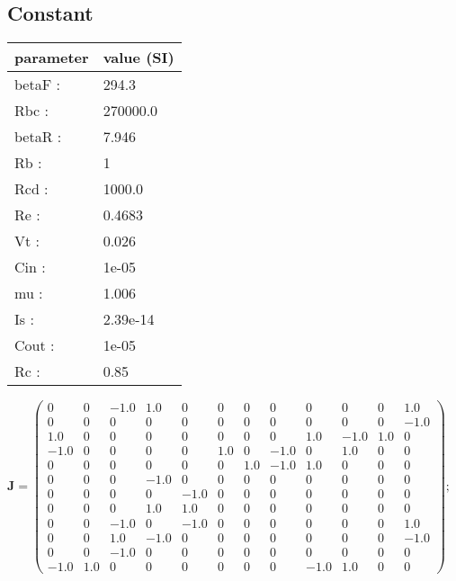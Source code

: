 \documentclass[11pt, oneside]{article}      %
\begin{document}
\subsection{Constant}
%
\begin{center}
%
\begin{tabular}{ll}
%
\hline
parameter & value (SI)
\\ \hline
betaF :& 294.3
\\
Rbc :& 270000.0
\\
betaR :& 7.946
\\
Rb :& 1
\\
Rcd :& 1000.0
\\
Re :& 0.4683
\\
Vt :& 0.026
\\
Cin :& 1e-05
\\
mu :& 1.006
\\
Is :& 2.39e-14
\\
Cout :& 1e-05
\\
Rc :& 0.85
\\
\hline
\end{tabular}
%
\end{center}
%
$ \mathbf{J} = \left(\begin{array}{cccccccccccc}0 & 0 & -1.0 & 1.0 & 0 & 0 & 0 & 0 & 0 & 0 & 0 & 1.0\\0 & 0 & 0 & 0 & 0 & 0 & 0 & 0 & 0 & 0 & 0 & -1.0\\1.0 & 0 & 0 & 0 & 0 & 0 & 0 & 0 & 1.0 & -1.0 & 1.0 & 0\\-1.0 & 0 & 0 & 0 & 0 & 1.0 & 0 & -1.0 & 0 & 1.0 & 0 & 0\\0 & 0 & 0 & 0 & 0 & 0 & 1.0 & -1.0 & 1.0 & 0 & 0 & 0\\0 & 0 & 0 & -1.0 & 0 & 0 & 0 & 0 & 0 & 0 & 0 & 0\\0 & 0 & 0 & 0 & -1.0 & 0 & 0 & 0 & 0 & 0 & 0 & 0\\0 & 0 & 0 & 1.0 & 1.0 & 0 & 0 & 0 & 0 & 0 & 0 & 0\\0 & 0 & -1.0 & 0 & -1.0 & 0 & 0 & 0 & 0 & 0 & 0 & 1.0\\0 & 0 & 1.0 & -1.0 & 0 & 0 & 0 & 0 & 0 & 0 & 0 & -1.0\\0 & 0 & -1.0 & 0 & 0 & 0 & 0 & 0 & 0 & 0 & 0 & 0\\-1.0 & 1.0 & 0 & 0 & 0 & 0 & 0 & 0 & -1.0 & 1.0 & 0 & 0\end{array}\right) ; $ 
%
\\
%
\end{document}

